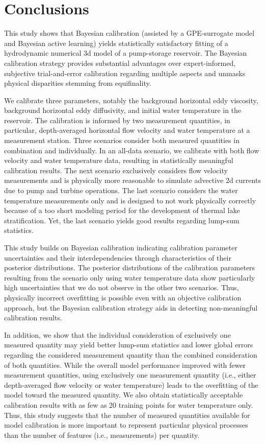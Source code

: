 \documentclass[draft,linenumbers,onecolumn]{agujournal2019} %
\begin{document}
\section{Conclusions}

This study shows that Bayesian calibration (assisted by a GPE-surrogate model and Bayesian active learning) yields statistically satisfactory fitting of a hydrodynamic numerical 3d model of a pump-storage reservoir. The Bayesian calibration strategy provides substantial advantages over expert-informed, subjective trial-and-error calibration regarding multiple aspects and unmasks physical disparities stemming from equifinality. 

We calibrate three parameters, notably the background horizontal eddy viscosity, background horizontal eddy diffusivity, and initial water temperature in the reservoir. The calibration is informed by two measurement quantities, in particular, depth-averaged horizontal flow velocity and water temperature at a measurement station. Three scenarios consider both measured quantities in combination and individually. In an all-data scenario, we calibrate with both flow velocity and water temperature data, resulting in statistically meaningful calibration results. The next scenario exclusively considers flow velocity measurements and is physically more reasonable to simulate advective 2d currents due to pump and turbine operations. The last scenario considers the water temperature measurements only and is designed to not work physically correctly because of a too short modeling period for the development of thermal lake stratification. Yet, the last scenario yields good results regarding lump-sum statistics.

This study builds on Bayesian calibration indicating calibration parameter uncertainties and their interdependencies through characteristics of their posterior distributions. The posterior distributions of the calibration parameters resulting from the scenario only using water temperature data show particularly high uncertainties that we do not observe in the other two scenarios. Thus, physically incorrect overfitting is possible even with an objective calibration approach, but the Bayesian calibration strategy aids in detecting non-meaningful calibration results.

In addition, we show that the individual consideration of exclusively one measured quantity may yield better lump-sum statistics and lower global errors regarding the considered measurement quantity than the combined consideration of both quantities. While the overall model performance improved with fewer measurement quantities, using exclusively one measurement quantity (i.e., either depth-averaged flow velocity or water temperature) leads to the overfitting of the model toward the measured quantity. We also obtain statistically acceptable calibration results with as few as 20 training points for water temperature only. Thus, this study suggests that the number of measured quantities available for model calibration is more important to represent particular physical processes than the number of features (i.e., measurements) per quantity.
\end{document}
